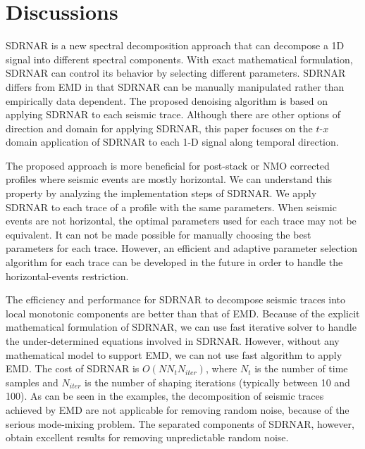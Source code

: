 \section{Discussions}

SDRNAR is a new spectral decomposition approach that can decompose a 1D signal into different spectral components. 
With exact mathematical formulation, SDRNAR can control its behavior by selecting different parameters. SDRNAR differs 
from EMD in that SDRNAR can be manually manipulated rather than empirically data dependent. The proposed denoising algorithm is 
based on applying SDRNAR to each seismic trace. Although there are other options of direction and domain for applying
SDRNAR, this paper focuses on the $t$-$x$ domain application of SDRNAR to each 1-D signal along temporal direction.

The proposed approach is more beneficial for post-stack or NMO corrected profiles where seismic events are mostly horizontal. We can 
understand this property by analyzing the implementation steps of SDRNAR. We apply SDRNAR to each trace of a profile with the same parameters. 
When seismic events are not horizontal, the optimal parameters used for each trace may not be equivalent. It can not be made possible for manually choosing the best parameters for each trace. 
However, an efficient and adaptive parameter selection algorithm for each trace can be developed in the future in order to handle the horizontal-events restriction.  


The efficiency and performance for SDRNAR to decompose seismic traces into local monotonic components are better than that of EMD. Because of the explicit 
mathematical formulation of SDRNAR, we can use fast iterative solver to handle the under-determined equations involved in SDRNAR. However, without any mathematical model to 
support EMD, we can not use fast algorithm to apply EMD. The cost of SDRNAR is $O(NN_tN_{iter})$, where $N_t$ is the number of time samples and $N_{iter}$ is the number of shaping iterations (typically between 10 and 100). As can be seen in the examples, the decomposition of seismic traces achieved by EMD are not applicable for removing
random noise, because of the serious mode-mixing problem. The separated components of SDRNAR, however, obtain excellent results for removing unpredictable random noise.




